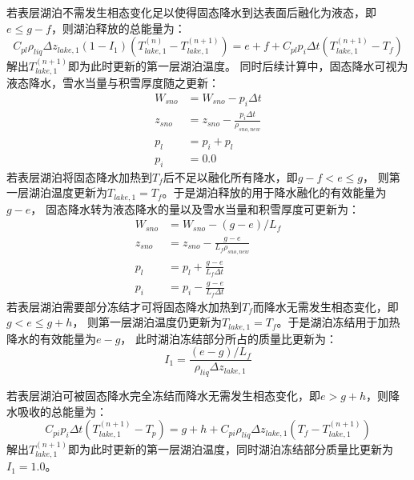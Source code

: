 若表层湖泊不需发生相态变化足以使得固态降水到达表面后融化为液态，即$e\leqslant g-f$，则湖泊释放的总能量为：
\begin{equation}
C_{p l} \rho_{liq} \Delta z_{lake, 1}\left(1-I_{1}\right)\left(T_{lake, 1}^{(n)}-T_{lake, 1}^{(n+1)}\right)=
e+f+C_{p l} p_{i} \Delta t\left(T_{lake, 1}^{(n+1)}-T_{f}\right)
\end{equation}
解出$T_{lake,1}^{\left(n+1\right)}$即为此时更新的第一层湖泊温度。
同时后续计算中，固态降水可视为液态降水，雪水当量与积雪厚度随之更新：
\begin{equation}
\begin{aligned}
    W_{sno} &= W_{sno}-p_{i} \Delta t \\ 
    z_{sno} &= z_{sno}-\frac{p_i \Delta t}{\rho_{sno,new}} \\
    p_l &= p_i + p_l \\ 
    p_i &= 0.0
\end{aligned}
\end{equation}
若表层湖泊将固态降水加热到$T_f$后不足以融化所有降水，即$g-f<e\leqslant g$，
则第一层湖泊温度更新为$T_{lake,1}=T_f$。于是湖泊释放的用于降水融化的有效能量为$g-e$，
固态降水转为液态降水的量以及雪水当量和积雪厚度可更新为：
\begin{equation}
\begin{aligned}
    W_{sno} &= W_{sno}-(g-e) / L_{f} \\ 
    z_{sno} &= z_{sno}-\frac{g-e}{L_f \rho_{sno,new}} \\
    p_{l} &= p_{l}+\frac{g-e}{L_f \Delta t} \\ 
    p_{i} &= p_{i}-\frac{g-e}{L_f \Delta t}
\end{aligned}
\end{equation}
若表层湖泊需要部分冻结才可将固态降水加热到$T_f$而降水无需发生相态变化，即$g<e\leqslant g+h$，
则第一层湖泊温度仍更新为$T_{lake,1}=T_f$。于是湖泊冻结用于加热降水的有效能量为$e-g$，
此时湖泊冻结部分所占的质量比更新为：
\begin{equation}
I_{1}=\frac{(e-g) / L_{f}}{\rho_{liq} \Delta z_{lake, 1}}
\end{equation}

若表层湖泊可被固态降水完全冻结而降水无需发生相态变化，即$e>g+h$，则降水吸收的总能量为：
\begin{equation}
C_{p i} p_{i} \Delta t\left(T_{lake, 1}^{(n+1)}-T_{p}\right)=g+h+C_{p i} \rho_{liq} \Delta z_{lake, 1}
\left(T_{f}-T_{lake,1}^{(n+1)}\right)
\end{equation}
解出$T_{lake,1}^{\left(n+1\right)}$即为此时更新的第一层湖泊温度，同时湖泊冻结部分质量比更新为$I_1=1.0$。


